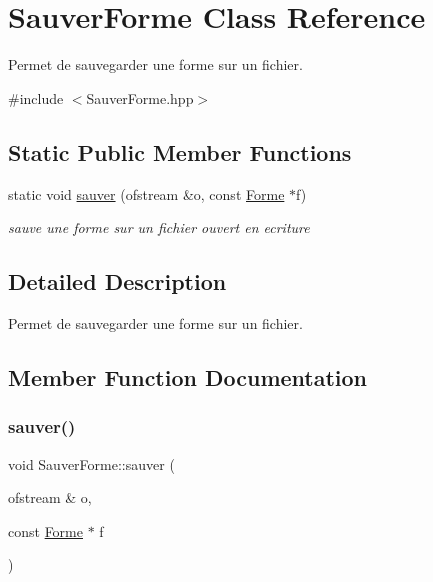 \hypertarget{class_sauver_forme}{}\section{Sauver\+Forme Class Reference}
\label{class_sauver_forme}


Permet de sauvegarder une forme sur un fichier.  




{\ttfamily \#include $<$Sauver\+Forme.\+hpp$>$}

\subsection*{Static Public Member Functions}
\begin{DoxyCompactItemize}
\item 
static void \mbox{\hyperlink{class_sauver_forme_a1a3002cc8f6a17ba0237266efcb26c0e}{sauver}} (ofstream \&o, const \mbox{\hyperlink{class_forme}{Forme}} $\ast$f)
\begin{DoxyCompactList}\small\item\em sauve une forme sur un fichier ouvert en ecriture \end{DoxyCompactList}\end{DoxyCompactItemize}


\subsection{Detailed Description}
Permet de sauvegarder une forme sur un fichier. 

\subsection{Member Function Documentation}
\mbox{\label{class_sauver_forme_a1a3002cc8f6a17ba0237266efcb26c0e}} 
\subsubsection{\texorpdfstring{sauver()}{sauver()}}
{\footnotesize\ttfamily void Sauver\+Forme\+::sauver (\begin{DoxyParamCaption}\item[{ofstream \&}]{o,  }\item[{const \mbox{\hyperlink{class_forme}{Forme}} $\ast$}]{f }\end{DoxyParamCaption})\hspace{0.3cm}{\ttfamily [static]}}



